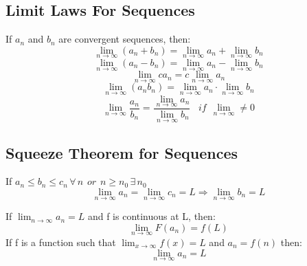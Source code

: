 \documentclass[12pt, letterpaper]{article}
\begin{document}
        
        \subsection*{Limit Laws For Sequences}
            If ${a_n}$ and ${b_n}$ are convergent sequences, then:
            \begin{equation*}
                \lim_{n \to \infty} (a_n + b_n) = \lim_{n \to \infty} a_n + \lim_{n \to \infty} b_n
            \end{equation*}
            \begin{equation*}
                \lim_{n \to \infty} (a_n - b_n) = \lim_{n \to \infty} a_n - \lim_{n \to \infty} b_n
            \end{equation*}
            \begin{equation*}
                \lim_{n \to \infty} ca_n = c \lim_{n \to \infty} a_n
            \end{equation*}
            \begin{equation*}
                \lim_{n \to \infty} (a_n b_n) = \lim_{n \to \infty} a_n \cdot \lim_{n \to \infty} b_n
            \end{equation*}
            \begin{equation*}
                \lim_{n \to \infty} \frac{a_n}{b_n} = \frac{\lim_{n \to \infty} a_n}{\lim_{n \to \infty} b_n} \hspace{10pt} if \hspace{5pt} \lim_{n \to \infty} \neq 0
            \end{equation*}
            
        \subsection*{Squeeze Theorem for Sequences}
            If $a_n \leq b_n \leq c_n \, \forall \, n \hspace{5pt} or \hspace{5pt} n\geq n_0 \, \exists \, n_0$
            \begin{equation*}
                \lim_{n \to \infty} a_n = \lim_{n \to \infty}c_n = L \Longrightarrow \lim_{n \to \infty}b_n = L
            \end{equation*}

            If $\lim_{n \to \infty} a_n = L$ and f is continuous at L, then:
            \begin{equation*}
                \lim_{n \to \infty} F(a_n) = f(L)
            \end{equation*}
            If f is a function such that $\lim_{x \to \infty} f(x) = L$ and $a_n = f(n)$ then:
            \begin{equation*}
                \lim_{n \to \infty} a_n = L
            \end{equation*}
\end{document}
